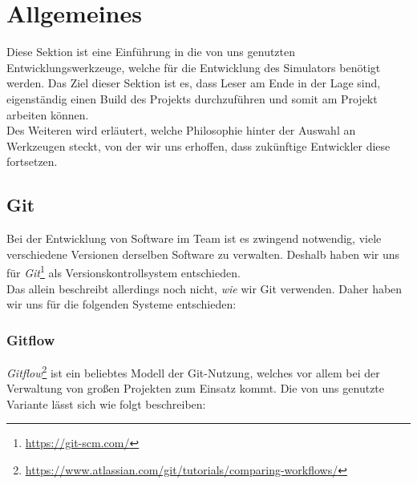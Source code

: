 
\section{Allgemeines}

Diese Sektion ist eine Einführung in die von uns genutzten Entwicklungswerkzeuge,
welche für die Entwicklung des Simulators benötigt werden. Das Ziel dieser Sektion
ist es, dass Leser am Ende in der Lage sind, eigenständig einen Build des Projekts
durchzuführen und somit am Projekt arbeiten können. \\
Des Weiteren wird erläutert, welche Philosophie hinter der Auswahl an Werkzeugen
steckt, von der wir uns erhoffen, dass zukünftige Entwickler diese fortsetzen.

\subsection{Git}
Bei der Entwicklung von Software im Team ist es zwingend notwendig, viele verschiedene Versionen
derselben Software zu verwalten. Deshalb haben wir uns für
\textit{Git}\footnote{\url{https://git-scm.com/}} als Versionskontrollsystem entschieden. \\
Das allein beschreibt allerdings noch nicht, \textit{wie} wir Git verwenden. Daher haben wir uns für
die folgenden Systeme entschieden:

\subsubsection{Gitflow}

\textit{Gitflow}\footnote{\url{https://www.atlassian.com/git/tutorials/comparing-workflows/}} ist
ein beliebtes Modell der Git-Nutzung, welches vor allem bei der Verwaltung von großen Projekten
zum Einsatz kommt. Die von uns genutzte Variante lässt sich wie folgt beschreiben:


